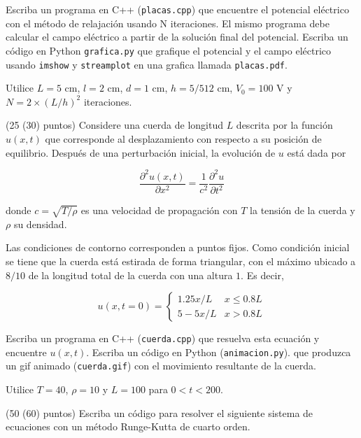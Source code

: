 \documentclass[11pt,letterpaper]{exam}
\begin{document}
\begin{questions}
Escriba un programa en C++ (\verb"placas.cpp") que encuentre el
potencial el\'ectrico con el m\'etodo de relajaci\'on usando N
iteraciones. El mismo programa debe calcular el campo el\'ectrico a
partir de la soluci\'on final del potencial.
Escriba un c\'odigo en Python \verb'grafica.py' que grafique el
potencial y el campo el\'ectrico usando \verb'imshow' y
\verb'streamplot' en una grafica llamada \verb'placas.pdf'.

Utilice $L = 5$ cm, $l = 2$ cm, $d = 1$ cm, $h = 5/512$ cm, $V_0 = 100$ V y $N = 2\times (L/h)^2$ iteraciones.


(25 (30) puntos) Considere una cuerda de longitud $L$ descrita por la funci\'on
$u(x,t)$ que corresponde al desplazamiento con respecto a su
posici\'on de equilibrio. Despu\'es de una perturbaci\'on inicial, la
evoluci\'on de $u$ est\'a dada por 

\begin{equation}
\frac{\partial^2 u (x,t)}{\partial x^2} =
\frac{1}{c^2}\frac{\partial^2 u}{\partial t^2}
\end{equation}

donde $c=\sqrt{T/\rho}$ es una velocidad de propagaci\'on con $T$ la
tensi\'on de la cuerda y $\rho$ su densidad.

Las condiciones de contorno corresponden a puntos fijos.  Como
condici\'on inicial se tiene que la cuerda est\'a estirada de forma
triangular, con el m\'aximo ubicado a $8/10$ de la longitud total de
la cuerda con una altura $1$. Es decir,

\begin{equation}
u(x,t=0) = 
\begin{cases}
1.25x/L & x \leq 0.8L\\
5-5x/L & x>0.8L
\end{cases}
\end{equation}

Escriba un programa en C++ (\verb'cuerda.cpp') que resuelva esta
ecuaci\'on y encuentre $u(x,t)$. Escriba un c\'odigo en Python (\verb'animacion.py').
que produzca un gif animado (\verb'cuerda.gif') con el movimiento
resultante de la cuerda. 

Utilice $T=40$, $\rho = 10$ y $L=100$ para $0<t<200$. 



(50 (60) puntos) Escriba un c\'odigo para resolver el siguiente
sistema de ecuaciones con un m\'etodo Runge-Kutta de cuarto orden.


\end{questions}
\end{document}
